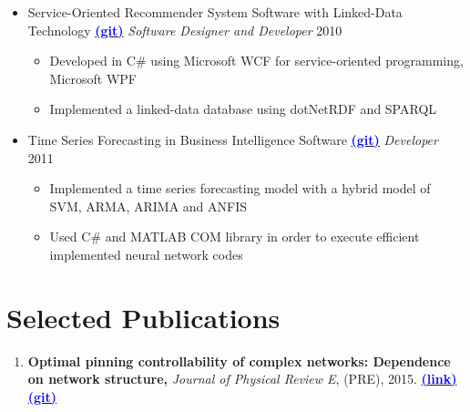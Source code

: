 \documentclass[letter]{res}
\begin{document}
\begin{resume}
\begin{itemize}[leftmargin=-.1in]
\item Service-Oriented Recommender System Software with Linked-Data Technology {\href{https://github.com/omid55/service_oriented_linked_data_based_recommender_system}{\textbf{\textcolor{blue}{(git)}}}}
\newline
{\sl Software Designer and Developer} \hfill 2010\\
   \vspace{-4mm}
   \iflong
     \begin{itemize}
        \item Developed in C\# using Microsoft WCF for service-oriented programming, Microsoft WPF
        \item Implemented a linked-data database using dotNetRDF and SPARQL
     \end{itemize}
   \fi

\item Time Series Forecasting in Business Intelligence Software {\href{https://github.com/omid55/time_series_forecasting_business_intelligence}{\textbf{\textcolor{blue}{(git)}}}}
\newline
{\sl Developer} \hfill 2011\\
   \vspace{-4mm}
   \iflong
     \begin{itemize}
        \item Implemented a time series forecasting model with a hybrid model of SVM, ARMA, ARIMA and ANFIS
        \item Used C\# and MATLAB COM library in order to execute efficient implemented neural network codes
     \end{itemize}
   \fi
   
\end{itemize}


\section{Selected Publications}
\begin{enumerate}[leftmargin=-.01in]
\item \textbf{Optimal pinning controllability of complex networks: Dependence on network structure,} \textit{Journal of Physical Review E}, (PRE), 2015.
\href{http://link.aps.org/doi/10.1103/PhysRevE.91.012803}{\textbf{\textcolor{blue}{(link)}}}
{\href{https://github.com/omid55/optimal_pinning_control}{\textbf{\textcolor{blue}{(git)}}}}


\end{enumerate}
\end{resume}
\end{document}
